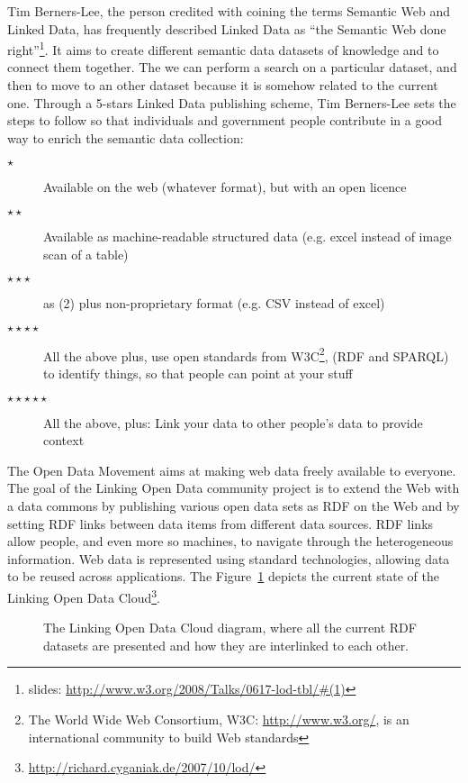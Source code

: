 Tim Berners-Lee, the person credited with coining the terms Semantic Web and
Linked Data, has frequently described Linked Data as ``the Semantic Web done
right''\footnote{slides: \url{http://www.w3.org/2008/Talks/0617-lod-tbl/\#(1)}}.
It aims to create different semantic data datasets of knowledge and to connect
them together. The we can perform a search on a particular dataset, and then to
move to an other dataset because it is somehow related to the current one.
Through a 5-stars Linked Data publishing scheme, Tim Berners-Lee sets the
steps to follow so that individuals and government people contribute in a good
way to enrich the semantic data collection:
\begin{description}
  \item[$\star$] Available on the web (whatever format), but with an open licence
  \item[$\star\star$] Available as machine-readable structured data (e.g. excel
  instead of image scan of a table)
  \item[$\star\star\star$] as (2) plus non-proprietary format (e.g. CSV instead
  of excel)
  \item[$\star\star\star\star$] All the above plus, use open standards from
 W3C\footnote{The World Wide Web Consortium, W3C: \url{http://www.w3.org/}, is
 an international community to build Web standards}, (RDF and SPARQL) to
 identify things, so that people can point at your stuff
  \item[$\star\star\star\star\star$] All the above, plus: Link your data to
  other people’s data to provide context
\end{description}

The Open Data Movement aims at making web data freely available to everyone. The
goal of the Linking Open Data community project is to extend the Web with a
data commons by publishing various open data sets as RDF on the Web and by
setting RDF links between data items from different data sources. RDF links
allow people, and even more so machines, to navigate through the heterogeneous
information. Web data is represented using standard technologies, allowing
data to be reused across applications. The Figure~\ref{fig:LOD} depicts the
current state of the Linking Open Data
Cloud\footnote{\url{http://richard.cyganiak.de/2007/10/lod/}}.

\begin{figure}
\centering
{}%
\caption{The Linking Open Data Cloud diagram, where all the current RDF
datasets are presented and how they are interlinked to each other.}
\label{fig:LOD}
\end{figure}

